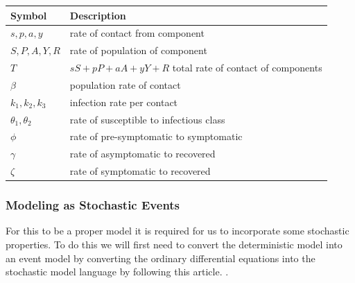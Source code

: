 \documentclass{article}
\begin{document}
\begin{center}
  \begin{tabular}{|l|l|}
    \hline
    Symbol                 & Description                                                \\ [0.5ex]
    \hline\hline
    $s, p, a, y$           & rate of contact from component                             \\
    \hline
    $S, P, A, Y, R$        & rate of population of component                            \\
    \hline
    $T$                    & $sS+ pP + aA + yY + R$ total rate of contact of components \\
    \hline
    $\beta$                & population rate of contact                                 \\
    \hline
    $k_1, k_2, k_3$        & infection rate per contact                                 \\
    \hline
    $\theta _1 , \theta_2$ & rate of susceptible to infectious class                    \\
    \hline
    $\phi$                 & rate of pre-symptomatic to symptomatic                     \\
    \hline
    $\gamma$               & rate of asymptomatic to recovered                          \\
    \hline
    $\zeta$                & rate of symptomatic to recovered                           \\
    \hline
  \end{tabular}
\end{center}


\subsubsection{Modeling as Stochastic Events}
For this to be a proper model it is required for us to incorporate some stochastic properties. To do this we will first need to convert the deterministic model into an event model by converting the ordinary differential equations into the stochastic model language by following this article. \cite{events}.
\end{document}
